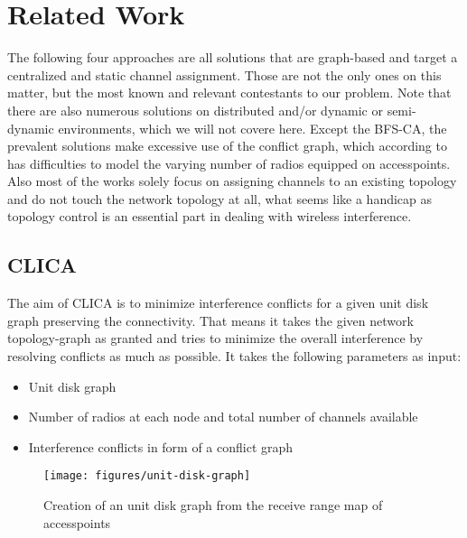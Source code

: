 \chapter{Related Work}
  The following four approaches are all solutions that are graph-based and target a centralized and static channel assignment.
  Those are not the only ones on this matter, but the most known and relevant contestants to our problem.
  Note that there are also numerous solutions on distributed and/or dynamic or semi-dynamic environments, which we will not covere here.
  Except the BFS-CA, the prevalent solutions make excessive use of the conflict graph, which according to \cite{overview_caa} has difficulties to model 
  the varying number of radios equipped on accesspoints. Also most of the works solely focus on assigning channels to an existing topology and do not touch 
  the network topology at all, what seems like a handicap as topology control is an essential part in dealing with wireless interference.
  
  \section{\ac{CLICA}}
    The aim of \ac{CLICA} \cite{CLICA} is to minimize interference conflicts for a given unit disk graph preserving the connectivity.
    That means it takes the given network topology-graph as granted and tries to minimize the overall interference by resolving conflicts as much as possible.
    It takes the following parameters as input:
    
    \begin{itemize}
      \item Unit disk graph
      
      \item Number of radios at each node and total number of channels available
      
      \item Interference conflicts in form of a conflict graph
    \end{itemize}

    \begin{figure}
      \centering
      \texttt{[image: figures/unit-disk-graph]}
      \caption{Creation of an unit disk graph from the receive range map of accesspoints}
      \label{fig:unit-disk-graph}
    \end{figure}
    
    \newpage
    
